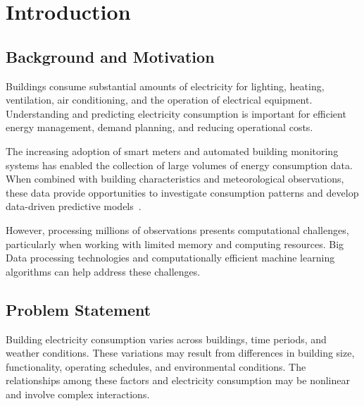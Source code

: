 \documentclass[12pt]{article}
\begin{document}
\tableofcontents
\clearpage

\listoffigures

\listoftables

\clearpage

\endgroup

\pagestyle{plain}

\section{Introduction}

\subsection{Background and Motivation}

Buildings consume substantial amounts of electricity for lighting, heating, ventilation, air conditioning, and the operation of electrical equipment. Understanding and predicting electricity consumption is important for efficient energy management, demand planning, and reducing operational costs.

The increasing adoption of smart meters and automated building monitoring systems has enabled the collection of large volumes of energy consumption data. When combined with building characteristics and meteorological observations, these data provide opportunities to investigate consumption patterns and develop data-driven predictive models~\parencite{miller2020building}.

However, processing millions of observations presents computational challenges, particularly when working with limited memory and computing resources. Big Data processing technologies and computationally efficient machine learning algorithms can help address these challenges.

\subsection{Problem Statement}

Building electricity consumption varies across buildings, time periods, and weather conditions. These variations may result from differences in building size, functionality, operating schedules, and environmental conditions. The relationships among these factors and electricity consumption may be nonlinear and involve complex interactions.
\end{document}
